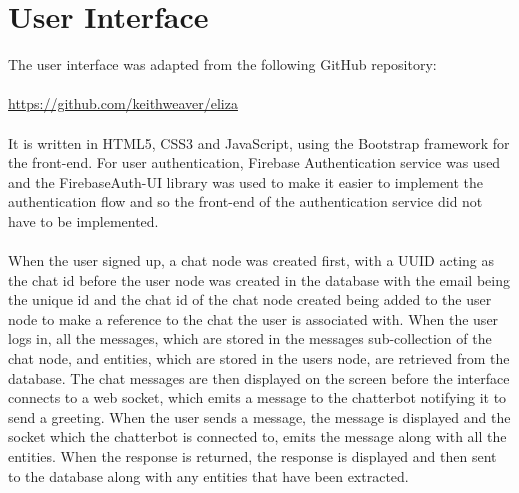 \section{User Interface}
The user interface was adapted from the following GitHub repository:\\\\
\url{https://github.com/keithweaver/eliza}\\\\
It is written in HTML5, CSS3 and JavaScript, using the Bootstrap framework for the front-end. For user authentication, Firebase Authentication service was used and the FirebaseAuth-UI library was used to make it easier to implement the authentication flow and so the front-end of the authentication service did not have to be implemented.\\\\
When the user signed up, a chat node was created first, with a UUID acting as the chat id before the user node was created in the database with the email being the unique id and the chat id of the chat node created being added to the user node to make a reference to the chat the user is associated with. When the user logs in, all the messages, which are stored in the messages sub-collection of the chat node, and entities, which are stored in the users node, are retrieved from the database. The chat messages are then displayed on the screen before the interface connects to a web socket, which emits a message to the chatterbot notifying it to send a greeting. When the user sends a message, the message is displayed and the socket which the chatterbot is connected to, emits the message along with all the entities. When the response is returned, the response is displayed and then sent to the database along with any entities that have been extracted.
